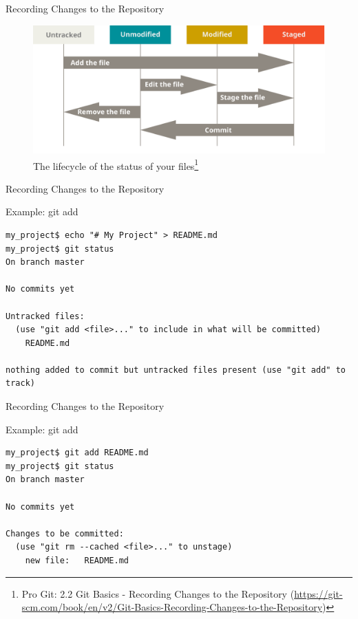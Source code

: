 \documentclass[aspectratio=169]{beamer}
\renewcommand{\footnotesize}{\tiny}
\newcommand{\sectiontitle}{}
\begin{document}
\begin{frame}{Recording Changes to the Repository}{\sectiontitle}
\begin{figure}
    \centering
    \includegraphics[width=\textwidth,height=0.6\textheight,keepaspectratio]{lifecycle}
    \caption{
        The lifecycle of the status of your files\footnote{
            Pro Git: 2.2 Git Basics - Recording Changes to the Repository
            (\url{https://git-scm.com/book/en/v2/Git-Basics-Recording-Changes-to-the-Repository})
        }
    }
\end{figure}
\end{frame}

\begin{frame}[fragile]{Recording Changes to the Repository}{\sectiontitle}
\begin{block}{Example: \ttfamily git add}
\begin{verbatim}
my_project$ echo "# My Project" > README.md
my_project$ git status
On branch master

No commits yet

Untracked files:
  (use "git add <file>..." to include in what will be committed)
    README.md

nothing added to commit but untracked files present (use "git add" to track)
\end{verbatim}
\end{block}
\end{frame}

\begin{frame}[fragile]{Recording Changes to the Repository}{\sectiontitle}
\begin{block}{Example: \ttfamily git add}
\begin{verbatim}
my_project$ git add README.md
my_project$ git status
On branch master

No commits yet

Changes to be committed:
  (use "git rm --cached <file>..." to unstage)
    new file:   README.md
\end{verbatim}
\end{block}
\end{frame}
\end{document}
